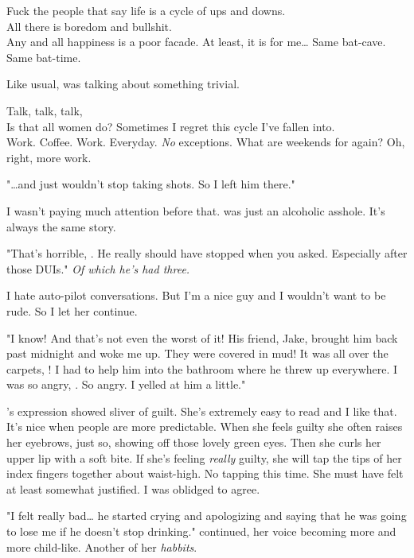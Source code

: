 \noindent
Fuck the people that say life is a cycle of ups and downs. \\
All there is boredom and bullshit. \\
Any and all happiness is a poor facade.  At least, it is for me\ldots
\lhoarb
\noindent
Same bat-cave. \\
Same bat-time.
\VV


\noindent
Like usual, \april{} was talking about something trivial.
\VV


\noindent
Talk, talk, talk,
\\
Is that all women do?
Sometimes I regret this cycle I've fallen into.
\\
Work.  Coffee.  Work. Everyday. \textit{No} exceptions.
What are weekends for again?  Oh, right, more work.
\VV


"\ldots{}and \eric{} just wouldn't stop taking shots.  So I left him there."
\VV


\noindent
I wasn't paying much attention before that.
\eric{} was just an alcoholic asshole.  It's always the same story.
\VV


"That's horrible, \april.  He really should have stopped when you asked.
Especially after those DUIs." \textit{Of which he's had three.}
\VV


\noindent
I hate auto-pilot conversations.
But I'm a nice guy and I wouldn't want to be rude.
So I let her continue.
\VV


"I know! And that's not even the worst of it!
His friend, Jake, brought him back past midnight and woke me up.
They were covered in mud!  It was all over the carpets, \josh!
I had to help him into the bathroom where he threw up everywhere.
I was so angry, \josh.  So angry.  I yelled at him a little."
\VV


\noindent
\april's expression showed sliver of guilt.
She's extremely easy to read and I like that.
It's nice when people are more predictable.
When she feels guilty she often raises her eyebrows, just so, showing off
those lovely green eyes.  Then she curls her upper lip with a soft bite.
If she's feeling \textit{really} guilty, she will tap the tips of her
index fingers together about waist-high.
No tapping this time.  She must have felt at least somewhat justified.
I was oblidged to agree.
\VV


"I felt really bad\ldots{} he started crying and apologizing and saying that he
was going to lose me if he doesn't stop drinking."
\april{} continued, her voice becoming more and more child-like.
Another of her \textit{habbits}.
\VV


